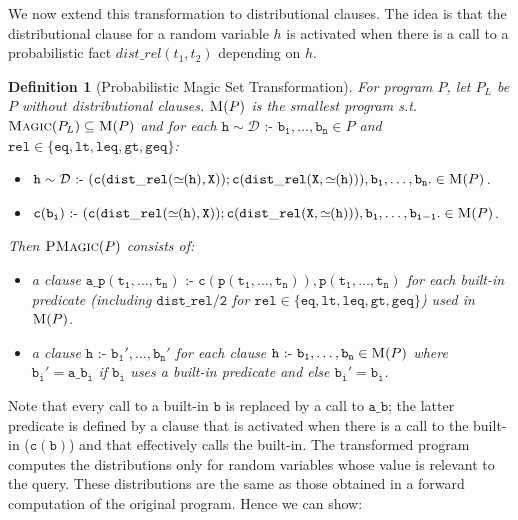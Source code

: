 \documentclass{tlp}
\newtheorem{definition}{Definition}
\newcommand{\coloneq}{\mbox{ :- }}
\newcommand{\val}{\simeq\!\!}
\begin{document}
We now extend this transformation to distributional clauses. The idea
is that the distributional clause for a random variable $h$ is
activated  when there is a call to a probabilistic fact
$dist\_rel(t_1, t_2)$ depending on $h$.

\begin{definition}[Probabilistic Magic Set Transformation]
  \label{def:pmagicsets}
  For program $P$, let $P_L$ be $P$ without distributional clauses.
  $\textsc{M}(P)$ is the smallest program s.t.  $\textsc{Magic}(P_L)
  \subseteq \textsc{M}(P)$ and for each $\mathtt{h} \sim \mathcal{D}
  \mathtt{ \coloneq b_1,\ldots,b_n} \in P$ and $\mathtt{rel} \in
  \{\mathtt{eq, lt, leq, gt, geq}\}$:
  \begin{itemize}
  \item $\mathtt{h} \sim \mathcal{D}\coloneq
    \mathtt{(c(dist\_rel(\val(h), X)); c(dist\_rel(X ,
      \val(h))),b_1,\ldots,b_n.} \in \textsc{M}(P)$.
  \item $\mathtt{c(b_i) \coloneq (c(dist\_rel(\val(h) , X));
      c(dist\_rel(X, \val(h))), b_1,\ldots, b_{i-1}. } \in \textsc{M}(P)$.
  \end{itemize}
   Then $\textsc{PMagic}(P)$ consists of:
  \begin{itemize}
  \item a clause $\mathtt{a\_p(t_1,\ldots,t_n)} \coloneq
    \mathtt{c(p(t_1,\ldots,t_n)), p(t_1,\ldots,t_n)}$ for each
    built-in predicate (including $\mathtt{dist\_rel/2}$ for
    $\mathtt{rel} \in \{\mathtt{eq, lt, leq, gt, geq} \}$) used in
    $\textsc{M}(P)$.

 \item a clause $\mathtt{h} \coloneq
    \mathtt{b_1',\ldots,b_n'}$ for each clause  $\mathtt{h} \coloneq \mathtt{b_1,\ldots,b_n} \in
    \textsc{M}(P)$ where $\mathtt{b_i'=a\_b_i}$ if $\mathtt{b_i}$ uses a built-in
    predicate and else $\mathtt{b_i'=b_i}$.
  \end{itemize}
\end{definition}

Note that every call to a built-in $\mathtt{b}$ is replaced by a call
to $\mathtt{a\_b}$; the latter predicate is defined by a clause that
is activated when there is a call to the built-in ($\mathtt{c(b)}$)
and that effectively calls the built-in.  The transformed program
computes the distributions only for random variables whose value is
relevant to the query. These distributions are the same as those
obtained in a forward computation of the original program. Hence we
can show:
\end{document}
